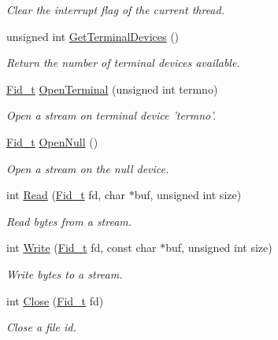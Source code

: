\begin{DoxyCompactItemize}
\begin{DoxyCompactList}\small\item\em Clear the interrupt flag of the current thread. \end{DoxyCompactList}\item 
unsigned int \hyperlink{group__syscalls_ga31576e1579c15b6b066038702e6557c7}{Get\-Terminal\-Devices} ()
\begin{DoxyCompactList}\small\item\em Return the number of terminal devices available. \end{DoxyCompactList}\item 
\hyperlink{group__syscalls_ga5097222c5f0da97d92d4712359abc38f}{Fid\-\_\-t} \hyperlink{group__syscalls_ga6ea2b586a8dfcfc1e7065e1664a0fb35}{Open\-Terminal} (unsigned int termno)
\begin{DoxyCompactList}\small\item\em Open a stream on terminal device 'termno'. \end{DoxyCompactList}\item 
\hyperlink{group__syscalls_ga5097222c5f0da97d92d4712359abc38f}{Fid\-\_\-t} \hyperlink{group__syscalls_ga39805b4ae668b715fb43f0f1e6ce8c45}{Open\-Null} ()
\begin{DoxyCompactList}\small\item\em Open a stream on the null device. \end{DoxyCompactList}\item 
int \hyperlink{group__syscalls_ga3e9dc545a789eb45b2d356eabbac3ee3}{Read} (\hyperlink{group__syscalls_ga5097222c5f0da97d92d4712359abc38f}{Fid\-\_\-t} fd, char $\ast$buf, unsigned int size)
\begin{DoxyCompactList}\small\item\em Read bytes from a stream. \end{DoxyCompactList}\item 
int \hyperlink{group__syscalls_gaf046f003fde24f79fb395c250137856c}{Write} (\hyperlink{group__syscalls_ga5097222c5f0da97d92d4712359abc38f}{Fid\-\_\-t} fd, const char $\ast$buf, unsigned int size)
\begin{DoxyCompactList}\small\item\em Write bytes to a stream. \end{DoxyCompactList}\item 
int \hyperlink{group__syscalls_ga82187e2e98af053a2ab6cb516e9e7f5a}{Close} (\hyperlink{group__syscalls_ga5097222c5f0da97d92d4712359abc38f}{Fid\-\_\-t} fd)
\begin{DoxyCompactList}\small\item\em Close a file id. \end{DoxyCompactList}\item 

\end{DoxyCompactItemize}
